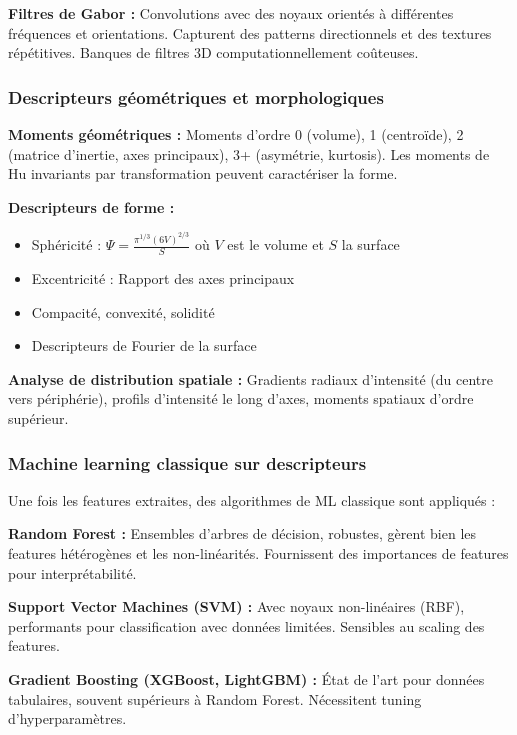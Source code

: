 \textbf{Filtres de Gabor :}
Convolutions avec des noyaux orientés à différentes fréquences et orientations. Capturent des patterns directionnels et des textures répétitives. Banques de filtres 3D computationnellement coûteuses.

\subsubsection{Descripteurs géométriques et morphologiques}

\textbf{Moments géométriques :}
Moments d'ordre 0 (volume), 1 (centroïde), 2 (matrice d'inertie, axes principaux), 3+ (asymétrie, kurtosis). Les moments de Hu invariants par transformation peuvent caractériser la forme.

\textbf{Descripteurs de forme :}
\begin{itemize}
    \item Sphéricité : $\Psi = \frac{\pi^{1/3}(6V)^{2/3}}{S}$ où $V$ est le volume et $S$ la surface
    \item Excentricité : Rapport des axes principaux
    \item Compacité, convexité, solidité
    \item Descripteurs de Fourier de la surface
\end{itemize}

\textbf{Analyse de distribution spatiale :}
Gradients radiaux d'intensité (du centre vers périphérie), profils d'intensité le long d'axes, moments spatiaux d'ordre supérieur.

\subsubsection{Machine learning classique sur descripteurs}

Une fois les features extraites, des algorithmes de ML classique sont appliqués :

\textbf{Random Forest :}
Ensembles d'arbres de décision, robustes, gèrent bien les features hétérogènes et les non-linéarités. Fournissent des importances de features pour interprétabilité.

\textbf{Support Vector Machines (SVM) :}
Avec noyaux non-linéaires (RBF), performants pour classification avec données limitées. Sensibles au scaling des features.

\textbf{Gradient Boosting (XGBoost, LightGBM) :}
État de l'art pour données tabulaires, souvent supérieurs à Random Forest. Nécessitent tuning d'hyperparamètres.

